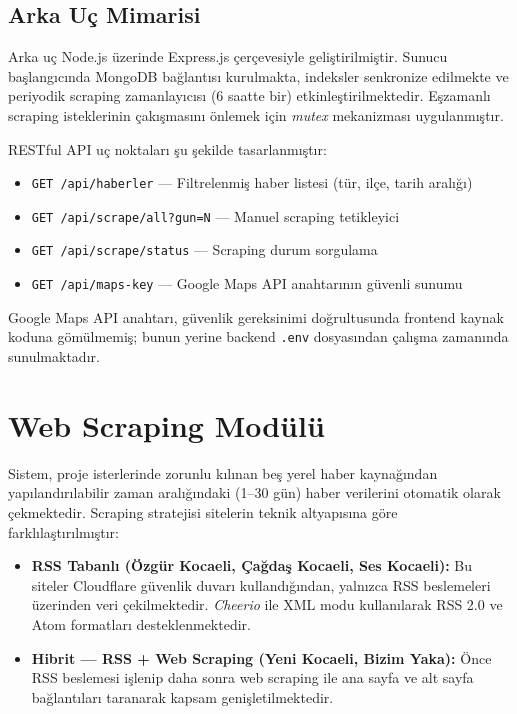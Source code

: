 \documentclass[conference]{IEEEtran}
\begin{document}
    \subsection{Arka U{\c c} Mimarisi}
    Arka u{\c c} Node.js {\"u}zerinde Express.js {\c c}er{\c c}evesiyle geli{\c s}tirilmi{\c s}tir. Sunucu ba{\c s}lang{\i}c{\i}nda MongoDB ba{\u g}lant{\i}s{\i} kurulmakta, indeksler senkronize edilmekte ve periyodik scraping zamanlay{\i}c{\i}s{\i} (6 saatte bir) etkinle{\c s}tirilmektedir. E{\c s}zamanl{\i} scraping isteklerinin {\c c}ak{\i}{\c s}mas{\i}n{\i} {\"o}nlemek i{\c c}in \textit{mutex} mekanizmas{\i} uygulanm{\i}{\c s}t{\i}r.

    RESTful API u{\c c} noktalar{\i} {\c s}u {\c s}ekilde tasarlanm{\i}{\c s}t{\i}r:
    \begin{itemize}[noitemsep]
    \item \texttt{GET /api/haberler} --- Filtrelenmi{\c s} haber listesi (t{\"u}r, il{\c c}e, tarih aral{\i}{\u g}{\i})
    \item \texttt{GET /api/scrape/all?gun=N} --- Manuel scraping tetikleyici
    \item \texttt{GET /api/scrape/status} --- Scraping durum sorgulama
    \item \texttt{GET /api/maps-key} --- Google Maps API anahtar{\i}n{\i}n g{\"u}venli sunumu
    \end{itemize}

    Google Maps API anahtar{\i}, g{\"u}venlik gereksinimi do{\u g}rultusunda frontend kaynak koduna g{\"o}m{\"u}lmemi{\c s}; bunun yerine backend \texttt{.env} dosyas{\i}ndan {\c c}al{\i}{\c s}ma zaman{\i}nda sunulmaktad{\i}r.

    \section{Web Scraping Mod{\"u}l{\"u}}

    Sistem, proje isterlerinde zorunlu k{\i}l{\i}nan be{\c s} yerel haber kayna{\u g}{\i}ndan yap{\i}land{\i}r{\i}labilir zaman aral{\i}{\u g}{\i}ndaki (1--30 g{\"u}n) haber verilerini otomatik olarak {\c c}ekmektedir. Scraping stratejisi sitelerin teknik altyap{\i}s{\i}na g{\"o}re farkl{\i}la{\c s}t{\i}r{\i}lm{\i}{\c s}t{\i}r:

    \begin{itemize}[noitemsep]
    \item \textbf{RSS Tabanl{\i} ({\"O}zg{\"u}r Kocaeli, {\c C}a{\u g}da{\c s} Kocaeli, Ses Kocaeli):} Bu siteler Cloudflare g{\"u}venlik duvar{\i} kulland{\i}{\u g}{\i}ndan, yaln{\i}zca RSS beslemeleri {\"u}zerinden veri {\c c}ekilmektedir. \textit{Cheerio} ile XML modu kullan{\i}larak RSS 2.0 ve Atom formatlar{\i} desteklenmektedir.
    \item \textbf{Hibrit --- RSS + Web Scraping (Yeni Kocaeli, Bizim Yaka):} {\"O}nce RSS beslemesi i{\c s}lenip daha sonra web scraping ile ana sayfa ve alt sayfa ba{\u g}lant{\i}lar{\i} taranarak kapsam geni{\c s}letilmektedir.
    \end{itemize}
\end{document}

